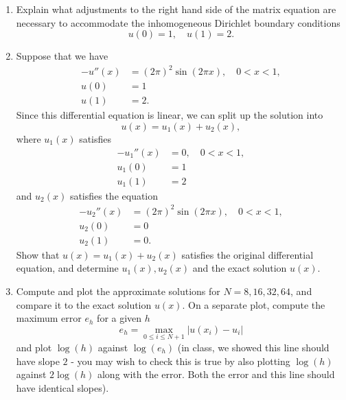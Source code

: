 \begin{enumerate}
\item Explain what adjustments to the right hand side of the matrix equation are necessary to accommodate the inhomogeneous Dirichlet boundary conditions
\[
u(0)=1,\quad  u(1)=2.
\]
\item Suppose that we have 
\begin{align*}
-u''(x) &= (2\pi)^2 \sin(2\pi x), \quad 0<x<1,\\
u(0) &= 1\\
u(1) &= 2.
\end{align*}
Since this differential equation is linear, we can split up the solution into 
$$u(x) = u_1(x) + u_2(x),$$ 
where $u_1(x)$ satisfies 
\begin{align*}
-u_1''(x) &= 0, \quad 0<x<1,\\
u_1(0) &= 1\\
u_1(1) &= 2
\end{align*}
and $u_2(x)$ satisfies the equation 
\begin{align*}
-u_2''(x) &= (2\pi)^2 \sin(2\pi x), \quad 0<x<1,\\
u_2(0) &= 0\\
u_2(1) &= 0.
\end{align*}
Show that $u(x) = u_1(x)+u_2(x)$ satisfies the original differential equation, and determine $u_1(x), u_2(x)$ and the exact solution $u(x)$.  %
\item Compute and plot the approximate solutions for $N=8, 16, 32, 64$, and compare it to the exact solution $u(x)$.  On a separate plot, compute the maximum error $e_h$ for a given $h$
\[
e_{h} = \max_{0 \leq i \leq N+1} | u(x_i) - u_i |
\]
and plot $\log(h)$ against $\log(e_h)$ (in class, we showed this line should have slope $2$ - you may wish to check this is true by also plotting $\log(h)$ against $2\log(h)$ along with the error.  Both the error and this line should have identical slopes).  
\end{enumerate} 



